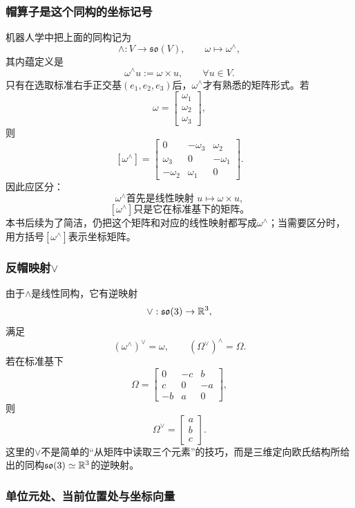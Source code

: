 \subsubsection*{帽算子是这个同构的坐标记号}

机器人学中把上面的同构记为
\[
    \wedge:V\to\mathfrak{so}(V),
    \qquad
    \omega\mapsto\omega^\wedge,
\]
其内蕴定义是
\[
    \boxed{
    \omega^\wedge u:=\omega\times u,
    \qquad
    \forall u\in V.
    }
\]
只有在选取标准右手正交基$(e_1,e_2,e_3)$后，$\omega^\wedge$才有熟悉的矩阵形式。若
\[
    \omega=
    \begin{bmatrix}
        \omega_1\\\omega_2\\\omega_3
    \end{bmatrix},
\]
则
\[
    [\omega^\wedge]
    =
    \begin{bmatrix}
        0&-\omega_3&\omega_2\\
        \omega_3&0&-\omega_1\\
        -\omega_2&\omega_1&0
    \end{bmatrix}.
\]
因此应区分：
\[
    \boxed{
    \omega^\wedge\text{首先是线性映射 }u\mapsto\omega\times u,
    }
\]
\[
    \boxed{
    [\omega^\wedge]\text{只是它在标准基下的矩阵。}
    }
\]
本书后续为了简洁，仍把这个矩阵和对应的线性映射都写成$\omega^\wedge$；当需要区分时，用方括号$[\omega^\wedge]$表示坐标矩阵。

\subsubsection*{反帽映射$\vee$}

由于$\wedge$是线性同构，它有逆映射
\[
    \vee:\mathfrak{so}(3)\to\mathbb{R}^3,
\]
满足
\[
    (\omega^\wedge)^\vee=\omega,
    \qquad
    (\Omega^\vee)^\wedge=\Omega.
\]
若在标准基下
\[
    \Omega=
    \begin{bmatrix}
        0&-c&b\\
        c&0&-a\\
        -b&a&0
    \end{bmatrix},
\]
则
\[
    \Omega^\vee=
    \begin{bmatrix}a\\b\\c\end{bmatrix}.
\]
这里的$\vee$不是简单的“从矩阵中读取三个元素”的技巧，而是三维定向欧氏结构所给出的同构$\mathfrak{so}(3)\simeq\mathbb{R}^3$的逆映射。

\subsubsection*{单位元处、当前位置处与坐标向量}

